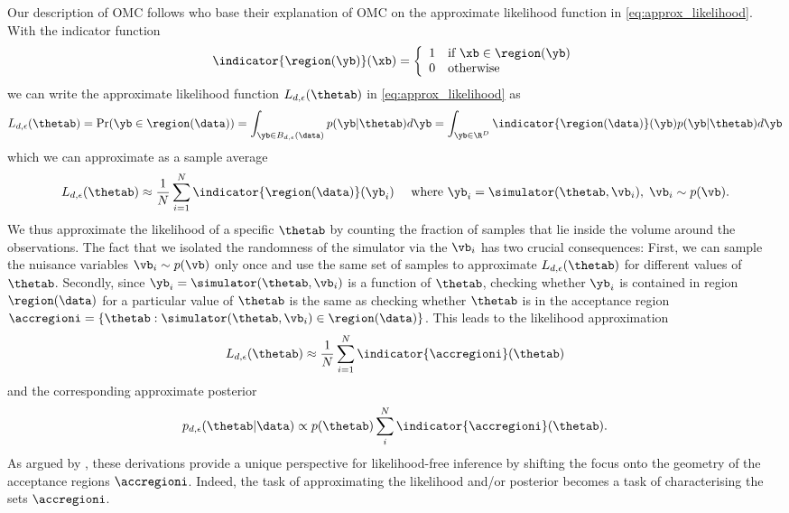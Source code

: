 Our description of OMC \citep{Meeds2015} follows \citet{Ikonomov2019}
who base their explanation of OMC on the approximate likelihood
function in \eqref{eq:approx_likelihood}. With the indicator function
%
\begin{equation} \label{eq:indicator} \indicator{\region(\yb)}(\xb)=
  \left\{
    \begin{array}{ll}
      1 & \mbox{if } \xb \in \region(\yb) \\
      0 & \mbox{otherwise} 
    \end{array} \right. \end{equation}
%
we can write the approximate likelihood function $L_{d, \epsilon}(\thetab)$ in \eqref{eq:approx_likelihood} as
\begin{gather} \label{eq:approx_likelihood_omc}
  L_{d, \epsilon}(\thetab) = \Pr(\yb \in \region(\data)) =
  \int_{\yb \in B_{d,\epsilon}(\data)}p(\yb|\thetab)d\yb =
  \int_{\yb \in \R^D} \indicator{\region(\data)}(\yb)p(\yb|\thetab)d\yb
\end{gather}
which we can approximate as a sample average
\begin{equation}
L_{d, \epsilon}(\thetab) \approx \frac{1}{N} \sum_{i=1}^N \indicator{\region (\data)} (\yb_i)
 \quad \text{ where } \yb_i = \simulator(\thetab, \vb_i),\; \vb_i \sim p(\vb). \label{eq:alt_view}
\end{equation}
We thus approximate the likelihood of a specific $\thetab$ by counting
the fraction of samples that lie inside the volume around the
observations. The fact that we isolated the randomness of the
simulator via the $\vb_i$ has two crucial consequences: First, we can
sample the nuisance variables $\vb_i \sim p(\vb)$ only once and use
the same set of samples to approximate $L_{d,\epsilon}(\thetab)$ for
different values of $\thetab$. Secondly, since
$\yb_i=\simulator(\thetab, \vb_i)$ is a function of $\thetab$,
checking whether $\yb_i$ is contained in region $\region (\data)$ for
a particular value of $\thetab$ is the same as checking whether
$\thetab$ is in the acceptance region $\accregioni
= \{ \thetab: \simulator(\thetab, \vb_i) \in \region(\data) \}$. This
leads to the likelihood approximation
\begin{equation}
L_{d, \epsilon}(\thetab) \approx \frac{1}{N} \sum_{i=1}^N \indicator{\accregioni}(\thetab) \label{eq:alt_view_theta}
\end{equation}
and the corresponding approximate posterior
\begin{equation} \label{eq:approx_posterior_omc}
  p_{d,\epsilon}(\thetab|\data) \propto
  p(\thetab) \sum_i^N  \indicator{\accregioni}(\thetab).
\end{equation}
As argued by \citet{Ikonomov2019}, these derivations provide a unique
perspective for likelihood-free inference by shifting the focus onto
the geometry of the acceptance regions $\accregioni$. Indeed, the task
of approximating the likelihood and/or posterior becomes a task of
characterising the sets $\accregioni$.

